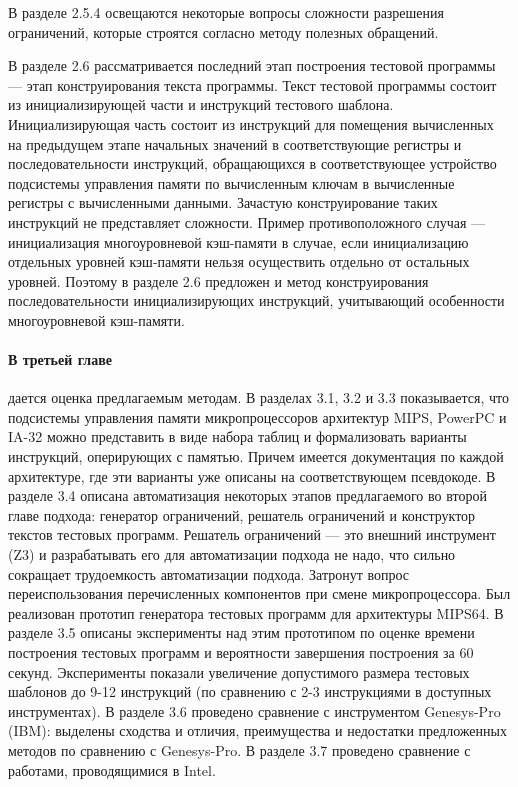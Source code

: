 \documentclass[14pt,autoref,href
,facsimile
]{disser}
\begin{document}
В разделе 2.5.4 освещаются некоторые вопросы сложности разрешения ограничений, которые строятся согласно методу полезных обращений.


В разделе 2.6 рассматривается последний этап построения тестовой программы --- этап конструирования текста программы. Текст тестовой программы состоит из инициализирующей части и инструкций тестового шаблона. Инициализирующая часть состоит из инструкций для помещения вычисленных на предыдущем этапе начальных значений в соответствующие регистры и последовательности инструкций, обращающихся в соответствующее устройство подсистемы управления памяти по вычисленным ключам в вычисленные регистры с вычисленными данными. Зачастую конструирование таких инструкций не представляет сложности. Пример противоположного случая --- инициализация многоуровневой кэш-памяти в случае, если инициализацию отдельных уровней кэш-памяти нельзя осуществить отдельно от остальных уровней. Поэтому в разделе 2.6 предложен и метод конструирования последовательности инициализирующих инструкций, учитывающий особенности многоуровневой кэш-памяти.

\paragraph{В третьей главе} дается оценка предлагаемым методам. В разделах 3.1, 3.2 и 3.3 показывается, что подсистемы управления памяти микропроцессоров архитектур MIPS, PowerPC и IA-32 можно представить в виде набора таблиц и формализовать варианты инструкций, оперирующих с памятью. Причем имеется документация по каждой архитектуре, где эти варианты уже описаны на соответствующем псевдокоде. В разделе 3.4 описана автоматизация некоторых этапов предлагаемого во второй главе подхода: генератор ограничений, решатель ограничений и конструктор текстов тестовых программ. Решатель ограничений --- это внешний инструмент (Z3) и разрабатывать его для автоматизации подхода не надо, что сильно сокращает трудоемкость автоматизации подхода. Затронут вопрос переиспользования перечисленных компонентов при смене микропроцессора. Был реализован прототип генератора тестовых программ для архитектуры MIPS64. В разделе 3.5 описаны эксперименты над этим прототипом по оценке времени построения тестовых программ и вероятности завершения построения за 60 секунд. Эксперименты показали увеличение допустимого размера тестовых шаблонов до 9-12 инструкций (по сравнению с 2-3 инструкциями в доступных инструментах). В разделе 3.6 проведено сравнение с инструментом Genesys-Pro (IBM): выделены сходства и отличия, преимущества и недостатки предложенных методов по сравнению с Genesys-Pro. В разделе 3.7 проведено сравнение с работами, проводящимися в Intel.
\end{document}
